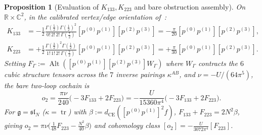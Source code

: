 \documentclass[11pt,letterpaper]{article}
\numberwithin{equation}{section}
\theoremstyle{plain}
\newtheorem{proposition}[theorem]{Proposition}
\theoremstyle{definition}
\theoremstyle{remark}
\newcommand{\fg}{\mathfrak{g}}
\newcommand{\fsl}{\mathfrak{sl}}
\newcommand{\tr}{\operatorname{tr}}
\newcommand{\Alt}{\operatorname{Alt}}
\begin{document}
\begin{proposition}[Evaluation of $K_{133}, K_{223}$ and bare obstruction assembly]
\label{prop:twoloop-evaluation}
On $\mathbb{R}\times\mathbb{C}^2$, in the calibrated vertex/edge orientation of~\cite[\S2.1]{RepoAllOrders}:
\begin{align}
\label{eq:K133-K223}
K_{133} &= -\frac{1}{2}\frac{\Gamma(\frac{5}{2})\Gamma(\frac{1}{2})^2}{0!\,2!\,2!\,\Gamma(\frac{7}{2})}[p^{(0)}p^{(1)}][p^{(2)}p^{(3)}] = -\frac{\pi}{20}[p^{(0)}p^{(1)}][p^{(2)}p^{(3)}], \nonumber\\
K_{223} &= +\frac{1}{2}\frac{\Gamma(\frac{3}{2})^2\Gamma(\frac{1}{2})}{1!\,1!\,2!\,\Gamma(\frac{7}{2})}[p^{(0)}p^{(1)}][p^{(2)}p^{(3)}] = +\frac{\pi}{30}[p^{(0)}p^{(1)}][p^{(2)}p^{(3)}].
\end{align}
Setting $F_\Gamma := \Alt([p^{(0)}p^{(1)}][p^{(2)}p^{(3)}]W_\Gamma)$ where $W_\Gamma$ contracts the $6$ cubic structure tensors across the $7$ inverse pairings $\kappa^{AB}$, and $\nu = -U/(64\pi^5)$, the bare two-loop cochain is
\begin{equation}
\label{eq:o2-assembled}
o_2 = \frac{\pi\nu}{240}\big({-}3 F_{133} + 2 F_{223}\big) = -\frac{U}{15360\pi^4}\big({-}3 F_{133} + 2 F_{223}\big).
\end{equation}
For $\fg = \fsl_N$ ($\kappa = \tr$) with $\beta := d_{\mathrm{CE}}([p^{(0)}p^{(1)}]^2 f)$, $F_{133} + F_{223} = 2N^2\beta$, giving $o_2 = \pi\nu\big(\frac{1}{48}F_{223} - \frac{N^2}{40}\beta\big)$ and cohomology class $[o_2] = -\frac{U}{3072\pi^4}[F_{223}]$.
\end{proposition}
\end{document}
